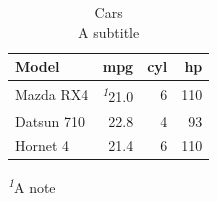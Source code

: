 \begin{table}[t]
\caption*{
{\fontsize{20}{25}\selectfont  Cars\fontsize{12}{15}\selectfont } \\ 
{\fontsize{14}{17}\selectfont  A subtitle\fontsize{12}{15}\selectfont }
} 
\fontsize{12.0pt}{14.0pt}\selectfont
\begin{tabular*}{\linewidth}{@{\extracolsep{\fill}}lrrr}
\toprule
Model & mpg & cyl & hp \\ 
\midrule\addlinespace[2.5pt]
Mazda RX4 & \textsuperscript{\textit{1}}21.0 & 6 & 110 \\ 
Datsun 710 & 22.8 & 4 & 93 \\ 
Hornet 4 & 21.4 & 6 & 110 \\ 
\bottomrule
\end{tabular*}
\begin{minipage}{\linewidth}
\vspace{.05em}
\textsuperscript{\textit{1}}A note\\
\end{minipage}
\end{table}

